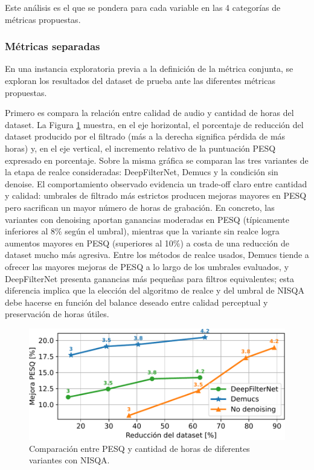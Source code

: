 Este análisis es el que se pondera para cada variable en las 4 categorías de métricas propuestas.

\subsubsection{Métricas separadas}
En una instancia exploratoria previa a la definición de la métrica conjunta, se exploran los resultados del dataset de prueba ante las diferentes métricas propuestas.

Primero es compara la relación entre calidad de audio y cantidad de horas del dataset. La Figura \ref{fig:horas_vs_pesq} muestra, en el eje horizontal, el porcentaje de reducción del dataset producido por el filtrado (más a la derecha significa pérdida de más horas) y, en el eje vertical, el incremento relativo de la puntuación PESQ expresado en porcentaje. Sobre la misma gráfica se comparan las tres variantes de la etapa de realce consideradas: DeepFilterNet, Demucs y la condición sin denoise. El comportamiento observado evidencia un trade-off claro entre cantidad y calidad: umbrales de filtrado más estrictos producen mejoras mayores en PESQ pero sacrifican un mayor número de horas de grabación. En concreto, las variantes con denoising aportan ganancias moderadas en PESQ (típicamente inferiores al 8\% según el umbral), mientras que la variante sin realce logra aumentos mayores en PESQ (superiores al 10\%) a costa de una reducción de dataset mucho más agresiva. Entre los métodos de realce usados, Demucs tiende a ofrecer las mayores mejoras de PESQ a lo largo de los umbrales evaluados, y DeepFilterNet presenta ganancias más pequeñas para filtros equivalentes; esta diferencia implica que la elección del algoritmo de realce y del umbral de NISQA debe hacerse en función del balance deseado entre calidad perceptual y preservación de horas útiles.

\begin{figure}[h]
  \centering
  \centerline{\includegraphics[width=12cm]{Figuras/Pipeline/PESQ vs horas (nisqa).pdf}}
  \caption{Comparación entre PESQ y cantidad de horas de diferentes variantes con NISQA.}
    \label{fig:horas_vs_pesq}
\end{figure}

